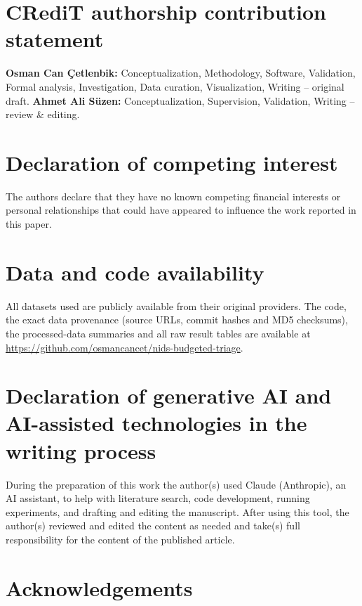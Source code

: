 \section*{CRediT authorship contribution statement}
\textbf{Osman Can Çetlenbik:} Conceptualization, Methodology, Software, Validation, Formal analysis, Investigation, Data curation, Visualization, Writing -- original draft.
\textbf{Ahmet Ali Süzen:} Conceptualization, Supervision, Validation, Writing -- review \& editing.

\section*{Declaration of competing interest}
The authors declare that they have no known competing financial interests or personal relationships that could have appeared to influence the work reported in this paper.

\section*{Data and code availability}
All datasets used are publicly available from their original providers. The code, the exact data provenance (source URLs, commit hashes and MD5 checksums), the processed-data summaries and all raw result tables are available at \url{https://github.com/osmancancet/nids-budgeted-triage}.

\section*{Declaration of generative AI and AI-assisted technologies in the writing process}
During the preparation of this work the author(s) used Claude (Anthropic), an AI assistant, to help with literature search, code development, running experiments, and drafting and editing the manuscript. After using this tool, the author(s) reviewed and edited the content as needed and take(s) full responsibility for the content of the published article.

\section*{Acknowledgements}
